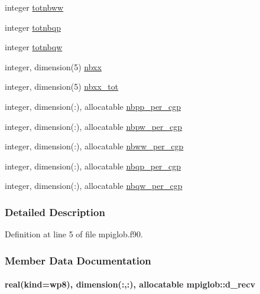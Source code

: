 \begin{DoxyCompactItemize}
\item 
integer \hyperlink{classmpiglob_a753b40fe692ea2067b87fe87288356ca}{totnbww}
\item 
integer \hyperlink{classmpiglob_a6fc8ee8d5ab60bb0373a76203d9abd14}{totnbqp}
\item 
integer \hyperlink{classmpiglob_a0dbb040aca4df972d9432f5babdb41d9}{totnbqw}
\item 
integer, dimension(5) \hyperlink{classmpiglob_af984afea8888f7db0e067cf37c534173}{nbxx}
\item 
integer, dimension(5) \hyperlink{classmpiglob_a9464db6473bd65e409a14dba4d316e14}{nbxx\-\_\-tot}
\item 
integer, dimension(\-:), allocatable \hyperlink{classmpiglob_aa959279cfbe1fe37e3258d939c68f439}{nbpp\-\_\-per\-\_\-cgp}
\item 
integer, dimension(\-:), allocatable \hyperlink{classmpiglob_ac58b58e3db74a75b6e86f6283cb7d88f}{nbpw\-\_\-per\-\_\-cgp}
\item 
integer, dimension(\-:), allocatable \hyperlink{classmpiglob_a8d9f2a5c2cd3bedd69003d3a215c235d}{nbww\-\_\-per\-\_\-cgp}
\item 
integer, dimension(\-:), allocatable \hyperlink{classmpiglob_a99445120c004f76c2b6eecd9684b21a2}{nbqp\-\_\-per\-\_\-cgp}
\item 
integer, dimension(\-:), allocatable \hyperlink{classmpiglob_a1993ff2eb88b6f49ea254628e399f390}{nbqw\-\_\-per\-\_\-cgp}
\end{DoxyCompactItemize}


\subsubsection{Detailed Description}


Definition at line 5 of file mpiglob.\-f90.



\subsubsection{Member Data Documentation}
\hypertarget{classmpiglob_a28a42af93cf4dd93dbb5c2c3a17c0be5}{
\paragraph[{d\-\_\-recv}]{\setlength{\rightskip}{0pt plus 5cm}real(kind=wp8), dimension(\-:,\-:), allocatable mpiglob\-::d\-\_\-recv}}\label{classmpiglob_a28a42af93cf4dd93dbb5c2c3a17c0be5}


